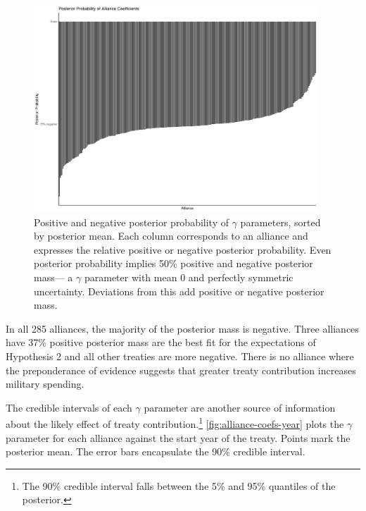 \documentclass[12pt]{article}
\begin{document}
\begin{figure}[htbp]
	\centering
		\includegraphics[width=0.95\textwidth]{full-post-prob.pdf}
	\caption{Positive and negative posterior probability of $\gamma$ parameters, sorted by posterior mean. Each column corresponds to an alliance and expresses the relative positive or negative posterior probability. Even posterior probability implies 50\% positive and negative posterior mass--- a $\gamma$ parameter with mean 0 and perfectly symmetric uncertainty. Deviations from this add positive or negative posterior mass.}
	\label{fig:full-post-prob}
\end{figure}


In all 285 alliances, the majority of the posterior mass is negative.  
Three alliances have 37\% positive posterior mass are the best fit for the expectations of Hypothesis 2 and all other treaties are more negative. 
There is no alliance where the preponderance of evidence suggests that greater treaty contribution increases military spending. 


The credible intervals of each $\gamma$ parameter are another source of information about the likely effect of treaty contribution.\footnote{The 90\% credible interval falls between the 5\% and 95\% quantiles of the posterior.} 
\autoref{fig:alliance-coefs-year} plots the $\gamma$ parameter for each alliance against the start year of the treaty.
Points mark the posterior mean. 
The error bars encapsulate the 90\% credible interval.
\end{document}
